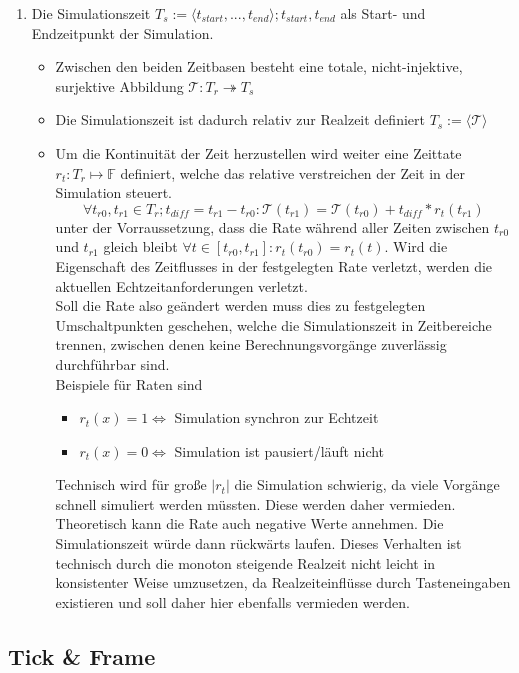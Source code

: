\begin{enumerate}
\item Die Simulationszeit $T_s:=\langle t_{start}, ... , t_{end}\rangle; t_{start}, t_{end}$ als Start- und Endzeitpunkt der Simulation.
	\begin{itemize}
	\item Zwischen den beiden Zeitbasen besteht eine totale, nicht-injektive, surjektive Abbildung $\mathcal{T}:T_r \twoheadrightarrow T_s$
	\item Die Simulationszeit ist dadurch relativ zur Realzeit definiert $T_s:=\langle\mathcal{T}\rangle$
	\item Um die Kontinuität der Zeit herzustellen wird weiter eine Zeittate $r_t:T_r\mapsto\mathbb{F}$ definiert, welche das relative verstreichen der Zeit in der Simulation steuert. 
	$$\forall t_{r0},  t_{r1} \in T_r ; t_{diff}=t_{r1}-t_{r0} :\mathcal{T}(t_{r1}) = \mathcal{T}(t_{r0}) + t_{diff}*r_t(t_{r1})$$ unter der Vorraussetzung, dass die Rate während aller Zeiten zwischen $t_{r0}$ und $t_{r1}$ gleich bleibt $\forall t \in [ t_{r0},t_{r1}]: r_t( t_{r0}) = r_t(t)$. Wird die Eigenschaft des Zeitflusses in der festgelegten Rate verletzt, werden die aktuellen Echtzeitanforderungen verletzt. \\
	Soll die Rate also geändert werden muss dies zu festgelegten Umschaltpunkten geschehen, welche die Simulationszeit in Zeitbereiche trennen, zwischen denen keine Berechnungsvorgänge zuverlässig durchführbar sind.\\
Beispiele für Raten sind 
\begin{itemize}
\item $r_t(x) = 1 \Leftrightarrow$ Simulation synchron zur Echtzeit
\item $r_t(x) = 0 \Leftrightarrow$ Simulation ist pausiert/läuft nicht
\end{itemize}
Technisch wird für große $|r_t|$ die Simulation schwierig, da viele Vorgänge schnell simuliert werden müssten. Diese werden daher vermieden.\\
Theoretisch kann die Rate auch negative Werte annehmen. Die Simulationszeit würde dann rückwärts laufen. Dieses Verhalten ist technisch durch die monoton steigende Realzeit nicht leicht in konsistenter Weise umzusetzen, da Realzeiteinflüsse durch Tasteneingaben existieren und soll daher hier ebenfalls vermieden werden.
	\end{itemize}
\end{enumerate}	


\subsection{Tick \& Frame}


